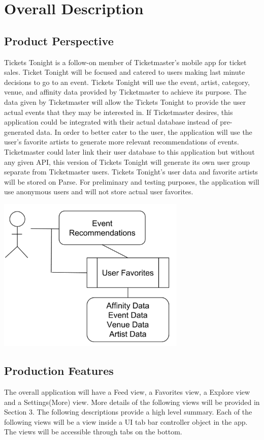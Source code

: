 	\section{Overall Description}
		\subsection{Product Perspective}
	      Tickets Tonight is a follow-on member of Ticketmaster’s mobile app for ticket sales. Ticket Tonight 
	      will be focused and catered to users making last minute decisions to go to an event. Tickets Tonight 
	      will use the event, artist, category, venue, and affinity data provided by Ticketmaster to achieve its 
	      purpose. The data given by Ticketmaster will allow the Tickets Tonight to provide the user actual 
	      events that they may be interested in. If Ticketmaster desires, this application could be integrated with 
	      their actual database instead of pre-generated data. In order to better cater to the user, the application 
	      will use the user’s favorite artists to generate more relevant recommendations of events. Ticketmaster 
	      could later link their user database to this application but without any given API, this version of 
	      Tickets Tonight will generate its own user group separate from Ticketmaster users. Tickets Tonight’s 
	      user data and favorite artists will be stored on Parse. For preliminary and testing purposes, the 
	      application will use anonymous users and will not store actual user favorites. 
		\begin{center}
			\includegraphics[width=90mm]{./pics/pp1.png}
		\end{center}
		\subsection{Production Features}
		 The overall application will have a Feed view, a Favorites view, a Explore view and a Settings(More) view. 
	 	 More details of the following views will be provided in Section 3. The following descriptions provide a 
		 high level summary. Each of the following views will be a view inside a UI tab bar controller object in the app. 
		 The views will be accessible through tabs on the bottom.
		

